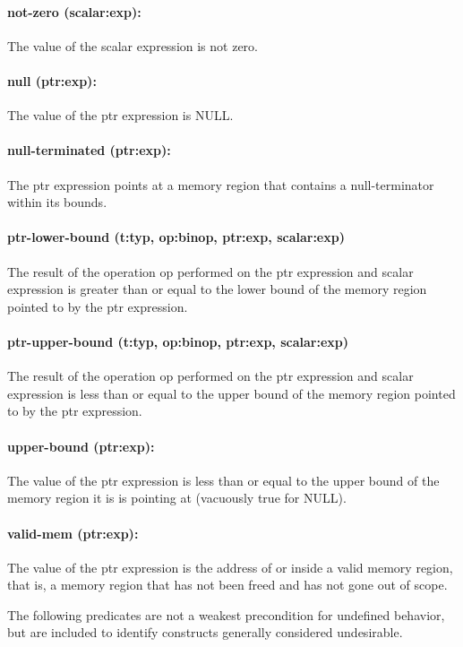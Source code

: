 \documentclass[11pt]{article}
\begin{document}
\paragraph{not-zero (scalar:exp): }
The value of the scalar expression is not zero.

\paragraph{null (ptr:exp): }
The value of the ptr expression is NULL.

\paragraph{null-terminated (ptr:exp): }
The ptr expression points at a memory region that contains a null-terminator
within its bounds.

\paragraph{ptr-lower-bound (t:typ, op:binop, ptr:exp, scalar:exp)}
The result of the operation op performed on the ptr expression and scalar expression
is greater than or equal to the lower bound of the memory region pointed to by
the ptr expression.

\paragraph{ptr-upper-bound (t:typ, op:binop, ptr:exp, scalar:exp)}
The result of the operation op performed on the ptr expression and scalar expression
is less than or equal to the upper bound of the memory region pointed to by the ptr
expression.

\paragraph{upper-bound (ptr:exp):}
The value of the ptr expression is less than or equal to the
    upper bound of the memory region it is is pointing at (vacuously true for NULL).

\paragraph{valid-mem (ptr:exp): }
The value of the ptr expression is the address of or inside a 
	valid memory region, that is, a memory region that has not been freed and
	has not gone out of scope.

The following predicates are not a weakest precondition for undefined behavior, but
are included to identify constructs generally considered undesirable.
\end{document}

